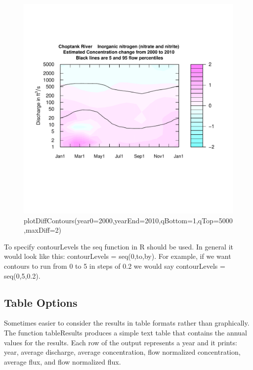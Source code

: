 \documentclass[a4paper,11pt]{article}\usepackage{graphicx, color}
\newenvironment{knitrout}{}{} %
\begin{document}
\begin{knitrout}
\color{fgcolor}\begin{figure}[]

\includegraphics[width=1\linewidth,height=1\linewidth]{figure/plotDiffContours} \caption[plotDiffContours(year0=2000,yearEnd=2010,qBottom=1,qTop=5000,maxDiff=2)]{plotDiffContours(year0=2000,yearEnd=2010,qBottom=1,qTop=5000,maxDiff=2)\label{fig:plotDiffContours}}
\end{figure}


\end{knitrout}


To specify contourLevels the seq function in R should be used.  In general it would look like this:  
contourLevels = seq(0,to,by).  For example, if we want contours to run from 0 to 5 in steps of 0.2 we would say contourLevels = seq(0,5,0.2).  



\FloatBarrier
\subsection{Table Options}
\label{sec:wrtdsTable}
Sometimes easier to consider the results in table formats rather than graphically. The function tableResults produces a simple text table that contains the annual values for the results.  Each row of the output represents a year and it prints: year, average discharge, average concentration, flow normalized concentration, average flux, and flow normalized flux.  
\end{document}
